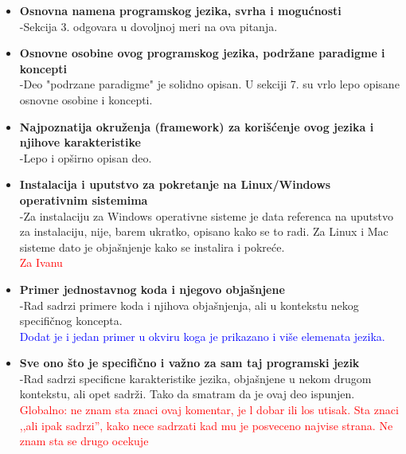 \documentclass[a4paper]{report}
\newcommand{\odgovorAutora}[1]{\textcolor{blue}{#1}}
\newcommand{\note}[1]{\textcolor{red}{#1}}
\begin{document}
\begin{enumerate}
\begin{itemize}
    \item \textbf {Osnovna namena programskog jezika, svrha i mogućnosti}\\
      -Sekcija 3. odgovara u dovoljnoj meri na ova pitanja.
    \item \textbf {Osnovne osobine ovog programskog jezika, podržane paradigme i koncepti}\\
      -Deo "podrzane paradigme" je solidno opisan. U sekciji 7. su vrlo lepo opisane osnovne osobine i koncepti.
    \item \textbf {Najpoznatija okruženja (framework) za korišćenje ovog jezika i njihove karakteristike}\\
      -Lepo i op\v sirno opisan deo.
    \item \textbf {Instalacija i uputstvo za pokretanje na Linux/Windows operativnim sistemima} \\
       -Za instalaciju za Windows operativne sisteme je data referenca na uputstvo za instalaciju, nije, barem ukratko, opisano kako se to radi. Za Linux i Mac sisteme dato je obja\v snjenje kako se instalira i pokre\' ce. \\
\note{Za Ivanu}
    \item \textbf {Primer jednostavnog koda i njegovo objašnjene}\\
      -Rad sadrzi primere koda i njihova obja\v snjenja, ali u kontekstu nekog specifi\v cnog koncepta. \\
\odgovorAutora{Dodat je i jedan primer u okviru koga je prikazano i više elemenata jezika.}
    \item \textbf {Sve ono što je specifično i važno za sam taj programski jezik} \\
      -Rad sadrzi specificne karakteristike jezika, obja\v snjene u nekom drugom kontekstu, ali opet sadr\v zi. Tako da smatram da je ovaj deo ispunjen.
\note{Globalno: ne znam sta znaci ovaj komentar, je l dobar ili los utisak. Sta znaci ,,ali ipak sadrzi'', kako nece sadrzati kad mu je posveceno najvise strana. Ne znam sta se drugo ocekuje}
\end{itemize}


\end{enumerate}
\end{document}

